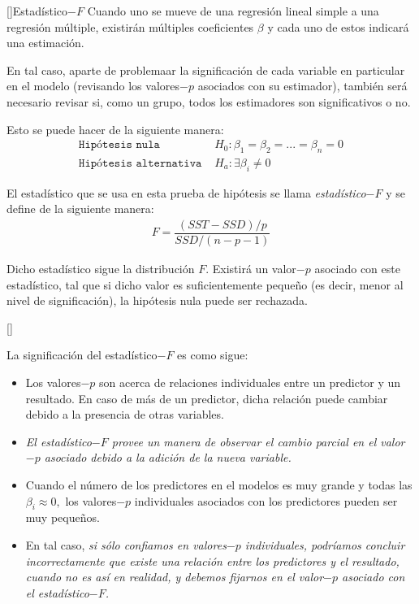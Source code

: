 []{Estadístico$-F$}
Cuando uno se mueve de una regresión lineal simple a una regresión múltiple, existirán múltiples coeficientes $\beta$ y cada uno de estos indicará una estimación.



En tal caso, aparte de problemaar la significación de cada variable en particular en el modelo (revisando los valores$-p$ asociados con su estimador), también será necesario revisar si, como un grupo, todos los estimadores son significativos o no.




Esto se puede hacer de la siguiente manera:
\begin{align}
	\texttt{Hipótesis nula }& H_{0}:\beta_{1}=\beta_{2}=...=\beta_{n}=0 \\
	\texttt{Hipótesis alternativa }& H_{a}: \exists \beta_{i}\neq 0
\end{align}



El estadístico que se usa en esta prueba de hipótesis se llama \emph{estadístico$-F$} y se define de la siguiente manera:
\begin{align}
	F = \dfrac{\left( SST -SSD \right)/p}{SSD/\left( n-p-1 \right)}
\end{align}



Dicho estadístico sigue la distribución $F$.
Existirá un valor$-p$ asociado con este estadístico, tal que si dicho valor es suficientemente pequeño (es decir, menor al nivel de significación), la hipótesis nula puede ser rechazada.


[]

La significación del estadístico$-F$ es como sigue:
\begin{itemize}
	\item Los valores$-p$ son acerca de relaciones individuales entre un predictor y un resultado. En caso de más de un predictor, dicha relación puede cambiar debido a la presencia de otras variables.
	
	
	\item
	\emph{El estadístico$-F$ provee un manera de observar el cambio parcial en el valor$-p$ asociado debido a la adición de la nueva variable.}
	
	
	\item Cuando el número de los predictores en el modelos es muy grande y todas las $\beta_{i}\approx 0,$ los valores$-p$ individuales asociados con los predictores pueden ser muy pequeños.
	
	
	\item
	En tal caso, \emph{si sólo confiamos en valores$-p$ individuales, podríamos concluir incorrectamente que existe una relación entre los predictores y el resultado, cuando no es así en realidad, y debemos fijarnos en el valor$-p$ asociado con el estadístico$-F$.}
\end{itemize}



